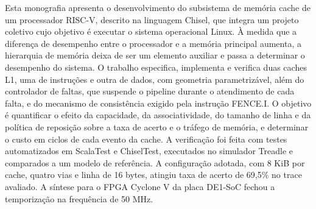 Esta monografia apresenta o desenvolvimento do subsistema de memória cache de um processador RISC-V, descrito na linguagem Chisel, que integra um projeto coletivo cujo objetivo é executar o sistema operacional Linux. À medida que a diferença de desempenho entre o processador e a memória principal aumenta, a hierarquia de memória deixa de ser um elemento auxiliar e passa a determinar o desempenho do sistema. O trabalho especifica, implementa e verifica duas caches L1, uma de instruções e outra de dados, com geometria parametrizável, além do controlador de faltas, que suspende o pipeline durante o atendimento de cada falta, e do mecanismo de consistência exigido pela instrução FENCE.I. O objetivo é quantificar o efeito da capacidade, da associatividade, do tamanho de linha e da política de reposição sobre a taxa de acerto e o tráfego de memória, e determinar o custo em ciclos de cada evento da cache. A verificação foi feita com testes automatizados em ScalaTest e ChiselTest, executados no simulador Treadle e comparados a um modelo de referência. A configuração adotada, com 8 KiB por cache, quatro vias e linha de 16 bytes, atingiu taxa de acerto de 69,5\% no trace avaliado. A síntese para o FPGA Cyclone V da placa DE1-SoC fechou a temporização na frequência de 50 MHz.

